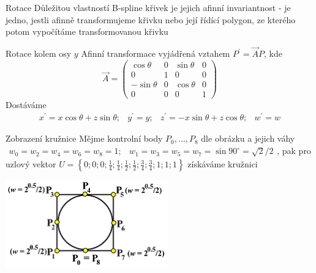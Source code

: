 \documentclass[hyperref={unicode}]{beamer}
\begin{document}
\begin{frame}{Rotace}
Důležitou vlastností B-spline křivek je jejich afinní invariantnost - je jedno, jestli afinně transformujeme křivku nebo její řídící polygon, ze kterého potom vypočítáme transformovanou křivku
\\\medskip
\begin{block}{Rotace kolem osy $y$}
Afinní transformace vyjádřená vztahem $P^\prime=\vec{A}P$, kde
$$\vec{A}=\begin{pmatrix} \cos\theta & 0 & \sin\theta & 0 \\ 0 & 1 & 0 & 0 \\ -\sin\theta & 0 & \cos\theta & 0 \\ 0 & 0 & 0 & 1 \end{pmatrix}$$
Dostáváme
$$\begin{matrix} x^\prime=x\cos\theta+z\sin\theta; & y^\prime=y; & z^\prime=-x\sin\theta+z\cos\theta; & w^\prime=w \end{matrix}$$
\end{block}
\end{frame}

\begin{frame}{Zobrazení kružnice}
Mějme kontrolní body $P_0,...,P_8$ dle obrázku a jejich váhy $\begin{matrix}w_0=w_2=w_4=w_6=w_8=1; & w_1=w_3=w_5=w_7=\sin90^{\circ}=\sqrt{2}/2\end{matrix}$, pak pro uzlový vektor $U=\left\lbrace 0; 0; 0; \frac{1}{4}; \frac{1}{4}; \frac{1}{2}; \frac{1}{2}; \frac{3}{4}; \frac{3}{4}; 1; 1; 1\right\rbrace $ získáváme kružnici
\begin{center}
	\includegraphics[width=7cm]{obrazky/circle.png}
\end{center}
\end{frame}
\end{document}
